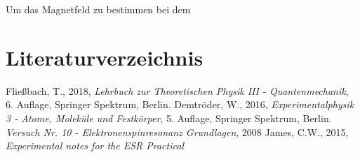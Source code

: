 \documentclass{scrartcl}
\begin{document}
Um das Magnetfeld zu bestimmen bei dem 




\newpage
\section{Literaturverzeichnis}
\begin{thebibliography}{}
 Fließbach, T., 2018, \textit{Lehrbuch zur Theoretischen Physik III - Quantenmechanik}, 6. Auflage, Springer Spektrum, Berlin.
 Demtröder, W., 2016, \textit{Experimentalphysik 3 - Atome, Moleküle und Festkörper}, 5. Auflage, Springer Spektrum, Berlin.
 \textit{Versuch Nr. 10 - Elektronenspinresonanz Grundlagen}, 2008
 James, C.W., 2015, \textit{Experimental notes for the ESR Practical}

\end{thebibliography}

	
\end{document}
